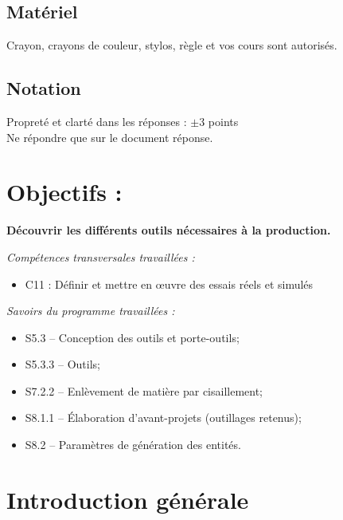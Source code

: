 \documentclass[12pt]{article}
\begin{document}
\subsection{Matériel}

Crayon, crayons de couleur, stylos, règle et vos cours sont autorisés.

\subsection{Notation}
\noindent
Propreté et clarté dans les réponses : $\pm$3 points\\
Ne répondre que sur le document réponse.\\


\section{Objectifs :}
\begin{center}
\textbf{Découvrir les différents outils nécessaires à la production.}\\
\end{center}

\begin{minipage}[t]{.55\linewidth}
\textit{Compétences transversales travaillées :}
\begin{itemize}
    \item C11 : Définir et mettre en œuvre des essais réels et simulés
\end{itemize}

\end{minipage}
\begin{minipage}[t]{.44\linewidth}
\textit{Savoirs du programme travaillées :}
\begin{itemize}
    \item S5.3 – Conception des outils et porte-outils;
    \item S5.3.3 – Outils;
    \item S7.2.2 – Enlèvement de matière par cisaillement;
    \item S8.1.1 – Élaboration d’avant-projets (outillages retenus);
    \item S8.2 – Paramètres de génération des entités.
\end{itemize}
\end{minipage}

\section{Introduction générale}
\end{document}
